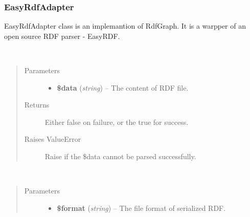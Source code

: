 \documentclass[letterpaper,10pt,english]{sphinxmanual}
\begin{document}
\subsubsection{EasyRdfAdapter}
\label{docs/api:easyrdfadapter}

\begin{fulllineitems}
\label{docs/api:EasyRdfAdapter}
EasyRdfAdapter class is an implemantion of RdfGraph. It is a warpper of an open source RDF parser - EasyRDF.

\begin{fulllineitems}
\label{docs/api:EasyRdfAdapter::parseRdf}~\begin{quote}\begin{description}
\item[{Parameters}] \leavevmode\begin{itemize}
\item {} 
\textbf{\$data} (\emph{string}) -- The content of RDF file.

\end{itemize}

\item[{Returns}] \leavevmode
Either false on failure, or the true for success.

\item[{Raises ValueError}] \leavevmode
Raise if the \$data cannot be parsed successfully.

\end{description}\end{quote}

\end{fulllineitems}


\begin{fulllineitems}
\label{docs/api:EasyRdfAdapter::serializeRdfAs}~\begin{quote}\begin{description}
\item[{Parameters}] \leavevmode\begin{itemize}
\item {} 
\textbf{\$format} (\emph{string}) -- The file format of serialized RDF.

\end{itemize}


\end{description}
\end{quote}
\end{fulllineitems}
\end{fulllineitems}
\end{document}
